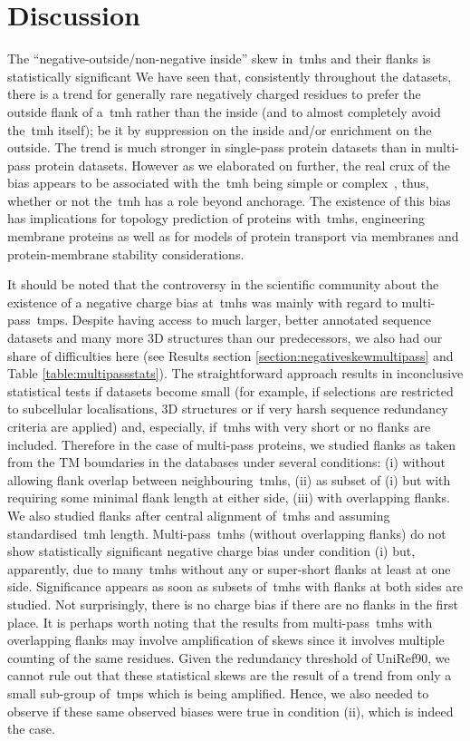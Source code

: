 \section{Discussion}

The ``negative-outside/non-negative inside'' skew in~\gls{tmh}s and their flanks is statistically significant
We have seen that, consistently throughout the datasets, there is a trend for generally rare negatively charged residues to prefer the outside flank of a~\gls{tmh} rather than the inside (and to almost completely avoid the~\gls{tmh} itself); be it by suppression on the inside and/or enrichment on the outside.
The trend is much stronger in single-pass protein datasets than in multi-pass protein datasets.
However as we elaborated on further, the real crux of the bias appears to be associated with the~\gls{tmh} being simple or complex~\cite{Wong2011, Wong2012}, thus, whether or not the~\gls{tmh} has a role beyond anchorage.
The existence of this bias has implications for topology prediction of proteins with~\gls{tmh}s, engineering membrane proteins as well as for models of protein transport via membranes and protein-membrane stability considerations.

It should be noted that the controversy in the scientific community about the existence of a negative charge bias at~\gls{tmh}s was mainly with regard to multi-pass~\gls{tmp}s.
Despite having access to much larger, better annotated sequence datasets and many more 3D structures than our predecessors, we also had our share of difficulties here (see Results section \ref{section:negativeskewmultipass} and Table \ref{table:multipassstats}).
The straightforward approach results in inconclusive statistical tests if datasets become small (for example, if selections are restricted to subcellular localisations, 3D structures or if very harsh sequence redundancy criteria are applied) and, especially, if~\gls{tmh}s with very short or no flanks are included.
Therefore in the case of multi-pass proteins, we studied flanks as taken from the TM boundaries in the databases under several conditions: (i) without allowing flank overlap between neighbouring~\gls{tmh}s, (ii) as subset of (i) but with requiring some minimal flank length at either side, (iii) with overlapping flanks.
We also studied flanks after central alignment of~\gls{tmh}s and assuming standardised~\gls{tmh} length.
Multi-pass~\gls{tmh}s (without overlapping flanks) do not show statistically significant negative charge bias under condition (i) but, apparently, due to many~\gls{tmh}s without any or super-short flanks at least at one side.
Significance appears as soon as subsets of~\gls{tmh}s with flanks at both sides are studied.
Not surprisingly, there is no charge bias if there are no flanks in the first place.
It is perhaps worth noting that the results from multi-pass~\gls{tmh}s with overlapping flanks may involve amplification of skews since it involves multiple counting of the same residues.
Given the redundancy threshold of UniRef90, we cannot rule out that these statistical skews are the result of a trend from only a small sub-group of~\gls{tmp}s which is being amplified.
Hence, we also needed to observe if these same observed biases were true in condition (ii), which is indeed the case.

